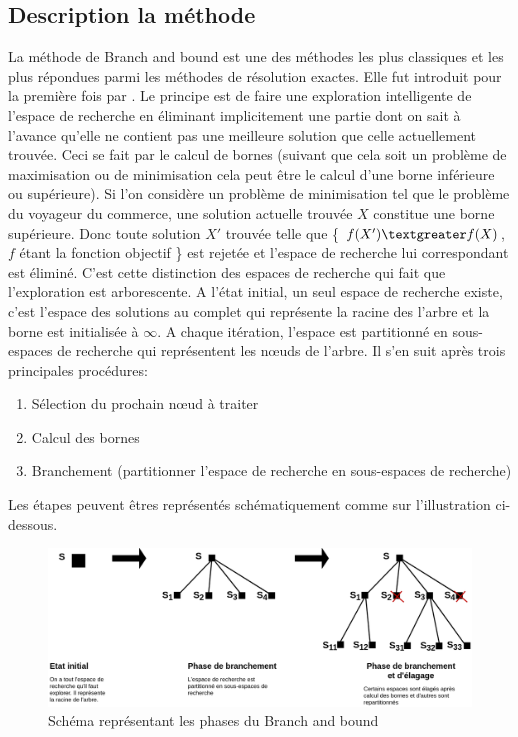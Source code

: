 \documentclass[12pt,a4paper,oneside]{book}
\theoremstyle{definition}
\begin{document}
	\subsection{Description la méthode}
	La méthode de Branch and bound est une des méthodes les plus classiques et les plus répondues parmi les méthodes de résolution exactes. Elle fut introduit pour la première fois par \cite{Land1960}. Le principe est de faire une exploration intelligente de l'espace de recherche en éliminant implicitement une partie dont on sait à l'avance qu'elle ne contient pas une meilleure solution que celle actuellement trouvée. Ceci se fait par le calcul de bornes (suivant que cela soit un problème de maximisation ou de minimisation cela peut être le calcul d'une borne inférieure ou supérieure). Si l'on considère un problème de minimisation tel que le problème du voyageur du commerce, une solution actuelle trouvée $X$ constitue une borne supérieure. Donc toute solution $X'$ trouvée telle que \{ $f(X') \textgreater f(X)$, $f$ étant la fonction objectif \} est rejetée et l'espace de recherche lui correspondant est éliminé. C'est cette distinction des espaces de recherche qui fait que l'exploration est arborescente. A l'état initial, un seul espace de recherche existe, c'est l'espace des solutions au complet qui représente la racine des l'arbre et la borne est initialisée à $\infty$. A chaque itération, l'espace est partitionné en sous-espaces de recherche qui représentent les nœuds de l'arbre. Il s'en suit après trois principales procédures:
	\begin{enumerate}
		\item Sélection du prochain nœud à traiter
		\item Calcul des bornes
		\item Branchement (partitionner l'espace de recherche en sous-espaces de recherche)
	\end{enumerate} 
	Les étapes peuvent êtres représentés schématiquement comme sur l'illustration ci-dessous.
	\begin{figure}[H]
		\centering
		\includegraphics[width=0.9\linewidth]{schema_b&b}
		\caption{Schéma représentant les phases du Branch and bound}
		\label{fig:schemabb}
	\end{figure}
	
\end{document}
